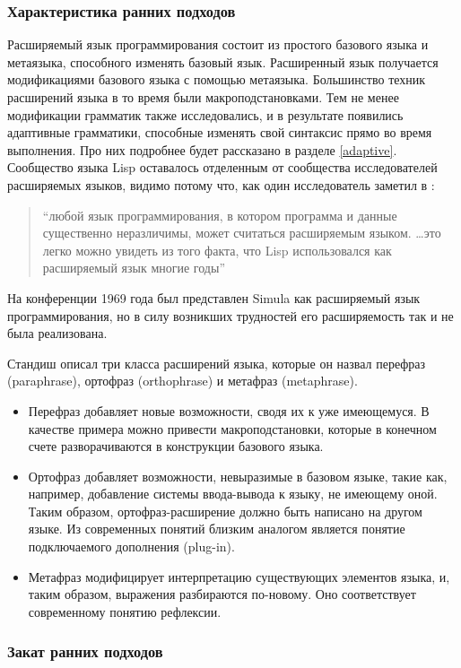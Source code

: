 \documentclass[a4paper,12pt]{article}
\begin{document}
\subsubsection*{Характеристика ранних подходов}

Расширяемый язык программирования состоит из простого базового языка и
метаязыка, способного изменять базовый язык. Расширенный язык получается
модификациями базового языка с помощью метаязыка. Большинство техник расширений
языка в то время были макроподстановками. Тем не менее модификации грамматик 
также исследовались, и в результате появились адаптивные грамматики, способные
изменять свой синтаксис прямо во время выполнения. Про них подробнее будет 
рассказано в разделе \ref{adaptive}. Сообщество языка Lisp оставалось отделенным
от сообщества исследователей расширяемых языков, видимо потому что, как один
исследователь заметил в \cite{harr60}:
\begin{quote}
``любой язык программирования, в котором программа и данные существенно
неразличимы, может считаться расширяемым языком. \ldots это легко можно увидеть
из того факта, что Lisp использовался как расширяемый язык многие годы''
\end{quote}
На конференции 1969 года был представлен Simula как расширяемый язык
программирования, но в силу возникших трудностей его расширяемость так и не
была реализована.

Стандиш описал три класса расширений языка, которые он назвал перефраз
(paraphrase), ортофраз (orthophrase) и метафраз (metaphrase).
\begin{itemize}
  \item Перефраз добавляет новые возможности, сводя их к уже имеющемуся. В
  качестве примера можно привести макроподстановки, которые в конечном счете
  разворачиваются в конструкции базового языка.
  \item Ортофраз добавляет возможности, невыразимые в базовом языке, такие как,
  например, добавление системы ввода-вывода к языку, не имеющему оной. Таким
  образом, ортофраз-расширение должно быть написано на другом языке. Из
  современных понятий близким аналогом является понятие подключаемого дополнения
  (plug-in).
  \item Метафраз модифицирует интерпретацию существующих элементов языка, и,
  таким образом, выражения разбираются по-новому. Оно соответствует
  современному понятию рефлексии.
\end{itemize}

\subsubsection*{Закат ранних подходов}
\end{document}
